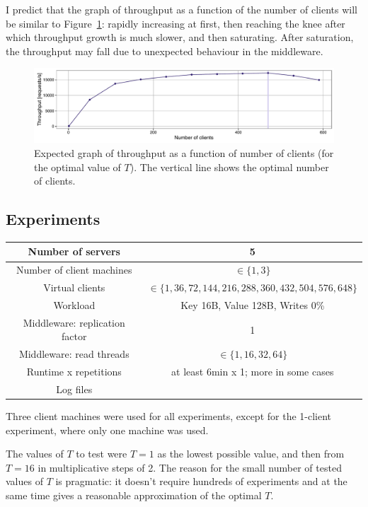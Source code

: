 \documentclass[11pt]{article}
\newcommand{\todo}[1]{\fcolorbox{black}{Apricot}{TODO: #1}}
\begin{document}
I predict that the graph of throughput as a function of the number of clients will be similar to Figure~\ref{fig:exp1:hyp:throughput}: rapidly increasing at first, then reaching the knee after which throughput growth is much slower, and then saturating. After saturation, the throughput may fall due to unexpected behaviour in the middleware.

\begin{figure}[h]
\centering
\includegraphics[width=\textwidth]{figures/hypothesis_throughput.pdf}
\caption{Expected graph of throughput as a function of number of clients (for the optimal value of $T$). The vertical line shows the optimal number of clients.}
\label{fig:exp1:hyp:throughput}
\end{figure}

\subsection{Experiments}
\begin{center}
\small{
\smallskip
\begin{tabular}{|c|c|}
\hline Number of servers & 5 \\ 
\hline Number of client machines & $\in \{1, 3\}$ \\ 
\hline Virtual clients & $\in \{1, 36, 72, 144, 216, 288, 360, 432, 504, 576, 648\}$ \\ 
\hline Workload & Key 16B, Value 128B, Writes 0\% \\
\hline Middleware: replication factor & 1 \\ 
\hline Middleware: read threads & $\in\{1, 16, 32, 64\}$ \\ 
\hline Runtime x repetitions & at least 6min x 1; more in some cases \\ 
\hline Log files & \todo{} \\
\hline 
\end{tabular} }
\end{center}

Three client machines were used for all experiments, except for the 1-client experiment, where only one machine was used.

The values of $T$ to test were $T=1$ as the lowest possible value, and then from $T=16$ in multiplicative steps of 2. The reason for the small number of tested values of $T$ is pragmatic: it doesn't require hundreds of experiments and at the same time gives a reasonable approximation of the optimal $T$.
\end{document}
